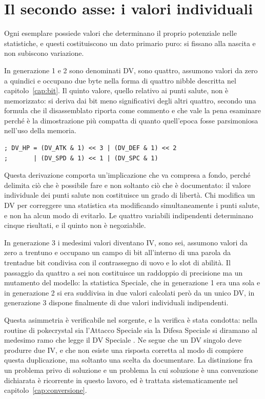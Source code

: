 \section{Il secondo asse: i valori individuali}

Ogni esemplare possiede valori che determinano il proprio potenziale nelle statistiche, e questi costituiscono un dato primario puro: si fissano alla nascita e non subiscono variazione.

In generazione 1 e 2 sono denominati DV, sono quattro, assumono valori da zero a quindici e occupano due byte nella forma di quattro nibble descritta nel capitolo~\ref{cap:bit}. Il quinto valore, quello relativo ai punti salute, non è memorizzato: si deriva dai bit meno significativi degli altri quattro, secondo una formula che il disassemblato riporta come commento e che vale la pena esaminare perché è la dimostrazione più compatta di quanto quell'epoca fosse parsimoniosa nell'uso della memoria.

\begin{verbatim}
; DV_HP = (DV_ATK & 1) << 3 | (DV_DEF & 1) << 2
;       | (DV_SPD & 1) << 1 | (DV_SPC & 1)
\end{verbatim}

Questa derivazione comporta un'implicazione che va compresa a fondo, perché delimita ciò che è possibile fare e non soltanto ciò che è documentato: il valore individuale dei punti salute non costituisce un grado di libertà. Chi modifica un DV per correggere una statistica sta modificando simultaneamente i punti salute, e non ha alcun modo di evitarlo. Le quattro variabili indipendenti determinano cinque risultati, e il quinto non è negoziabile.

In generazione 3 i medesimi valori diventano IV, sono sei, assumono valori da zero a trentuno e occupano un campo di bit all'interno di una parola da trentadue bit condivisa con il contrassegno di uovo e lo slot di abilità. Il passaggio da quattro a sei non costituisce un raddoppio di precisione ma un mutamento del modello: la statistica Speciale, che in generazione 1 era una sola e in generazione 2 si era suddivisa in due valori calcolati però da un unico DV, in generazione 3 dispone finalmente di due valori individuali indipendenti.

Questa asimmetria è verificabile nel sorgente, e la verifica è stata condotta: nella routine  di pokecrystal sia l'Attacco Speciale sia la Difesa Speciale si diramano al medesimo ramo che legge il DV Speciale \cite{pokecrystal}. Ne segue che un DV singolo deve produrre due IV, e che non esiste una risposta corretta al modo di compiere questa duplicazione, ma soltanto una scelta da documentare. La distinzione fra un problema privo di soluzione e un problema la cui soluzione è una convenzione dichiarata è ricorrente in questo lavoro, ed è trattata sistematicamente nel capitolo~\ref{cap:conversione}.

